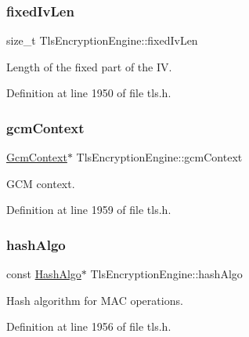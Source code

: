 \subsubsection{\texorpdfstring{fixed\+Iv\+Len}{fixedIvLen}}
{\footnotesize\ttfamily size\+\_\+t Tls\+Encryption\+Engine\+::fixed\+Iv\+Len}



Length of the fixed part of the IV. 



Definition at line 1950 of file tls.\+h.

\mbox{\label{structTlsEncryptionEngine_aef9d3f24e20174d9493d919ec8964b7c}} 
\subsubsection{\texorpdfstring{gcm\+Context}{gcmContext}}
{\footnotesize\ttfamily \hyperlink{structGcmContext}{Gcm\+Context}$\ast$ Tls\+Encryption\+Engine\+::gcm\+Context}



G\+CM context. 



Definition at line 1959 of file tls.\+h.

\mbox{\label{structTlsEncryptionEngine_a879e3f9933f7d2bf140e1eb8696d4abd}} 
\subsubsection{\texorpdfstring{hash\+Algo}{hashAlgo}}
{\footnotesize\ttfamily const \hyperlink{structHashAlgo}{Hash\+Algo}$\ast$ Tls\+Encryption\+Engine\+::hash\+Algo}



Hash algorithm for M\+AC operations. 



Definition at line 1956 of file tls.\+h.

\mbox{\label{structTlsEncryptionEngine_a6e659b6a95474feec4ee46f40c7b92e4}} 
